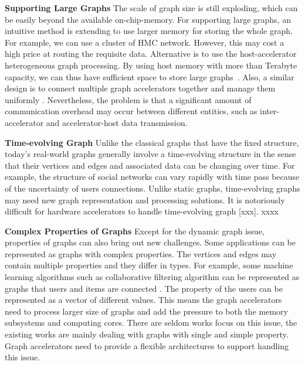 \documentclass[twoside]{article}
\begin{document}
\begin{multicols}{2}
\textbf{Supporting Large Graphs}
The scale of graph size is still exploding, which can be easily beyond the available on-chip-memory. For supporting large graphs, an intuitive method is extending to use larger memory for storing the whole graph. For example, we can use a cluster of HMC network. However, this may cost a high price at routing the requisite data. 
Alternative is to use the host-accelerator heterogeneous graph processing. By using host memory with more than Terabyte capacity, we can thus have sufficient space to store large graphs~\cite{Dai2016fpgp,Dai2017foregraph}. Also, a similar design is to connect multiple graph accelerators together and manage them uniformly \cite{ozdal2016energy,Dai2017foregraph}. Nevertheless, the problem is that a significant amount of communication overhead may occur between different entities, such as inter-accelerator and accelerator-host data transmission. 


\textbf{Time-evolving Graph}
Unlike the classical graphs that have the fixed structure, today's real-world graphs generally involve a time-evolving structure in the sense that their vertices and edges and associated data can be changing over time. 
  For example, the structure of social networks can vary rapidly with time pass because of the uncertainty of users connections. Unlike static graphs, time-evolving graphs may need new graph representation and processing solutions. It is notoriously difficult for hardware accelerators to handle time-evolving graph [xxx].  xxxx

\textbf{Complex Properties of Graphs}
Except for the dynamic graph issue, properties of graphs can also bring out new challenges. Some applications can be represented as graphs with complex properties. The vertices and edges may contain multiple properties and they differ in types. For example, some machine learning algorithms such as collaborative filtering algorithm can be represented as graphs that users and items are connected \cite{Zhang2016osdihiddendimension}. The property of the users can be represented as a vector of different values. This means the graph accelerators need to process larger size of graphs and add the pressure to both the memory subsystems and computing cores. There are seldom works focus on this issue, the existing works are mainly dealing with graphs with single and simple property. Graph accelerators need to provide a flexible architectures to support handling this issue.


\end{multicols}
\end{document}
